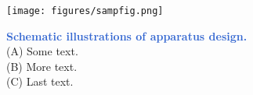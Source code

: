 
\newpage

\begin{figure}
\centering
\begin{subcaptiongroup}
\label{fig:1A} %
\label{fig:1B} %
\end{subcaptiongroup}
\texttt{[image: figures/sampfig.png]}
\caption{\textcolor{Highlight}{\textbf{Schematic illustrations of apparatus design.}}\\
(A)
Some text.\\
(B)
More text.\\
(C) 
Last text.
}
\label{fig:F1}

\end{figure}


\beginsupplement %